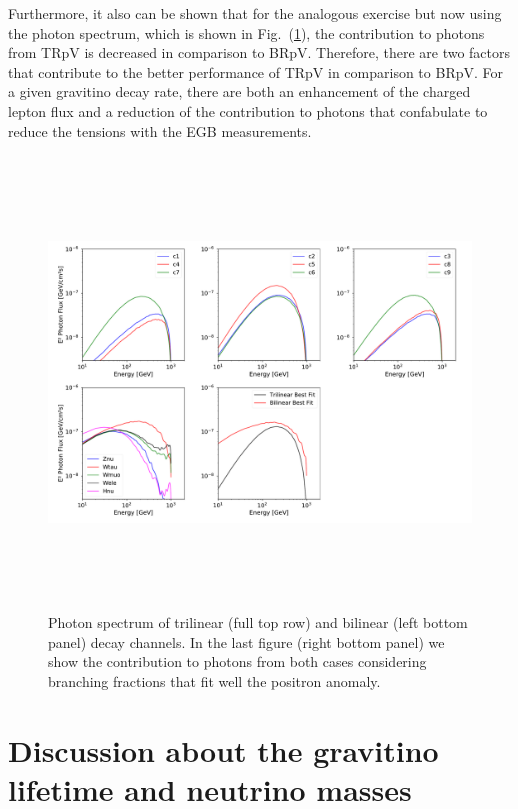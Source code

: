 \documentclass[a4paper,11pt]{article}
\begin{document}
Furthermore, it also can be shown that for the analogous exercise but now using the photon spectrum, which is shown in Fig.~(\ref{fig:photon-spectrum}), the contribution to photons from TRpV is decreased in comparison to BRpV. Therefore, there are two factors that contribute to the better performance of TRpV in comparison to BRpV. For a given gravitino decay rate, there are both an enhancement of the charged lepton flux and a reduction of the contribution to photons that confabulate to reduce the tensions with the EGB measurements.

\begin{figure}[htb]
\begin{center}
\includegraphics[height=12cm,width=16cm,angle=0]{Figures/exp_plots_gamma_rays_EGB_comparison.pdf}
\caption{Photon spectrum of trilinear (full top row) and bilinear (left bottom panel) decay channels. In the last figure (right bottom panel) we show the contribution to photons from both cases considering branching fractions that fit well the positron anomaly.}
\label{fig:photon-spectrum}
\end{center}
\end{figure}

\section{Discussion about the gravitino lifetime and neutrino masses}
\label{sec:lifetime-neutrinomasses}
\end{document}
